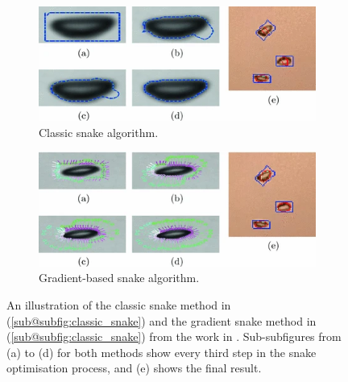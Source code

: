 \begin{figure}[H]
    \centering
    \begin{subfigure}{.49\textwidth}
        \centering
        \includegraphics[width=1\linewidth]{assets/classic_snake.png}
        \caption{Classic snake algorithm.}
        \label{subfig:classic_snake}
    \end{subfigure}
    \hfill
    \begin{subfigure}{.49\textwidth}
        \centering
        \includegraphics[width=1\linewidth]{assets/gradient_snake.png}
        \caption{Gradient-based snake algorithm.}
        \label{subfig:gradient_snake}
    \end{subfigure}
    \caption{An illustration of the classic snake method in (\ref{sub@subfig:classic_snake}) and the gradient snake method in (\ref{sub@subfig:classic_snake}) from the work in \cite{zelenkaGasBubbleShape2014a}. Sub-subfigures from (a) to (d) for both methods show every third step in the snake optimisation process, and (e) shows the final result.}
    \label{fig:snake_methods}
\end{figure}

